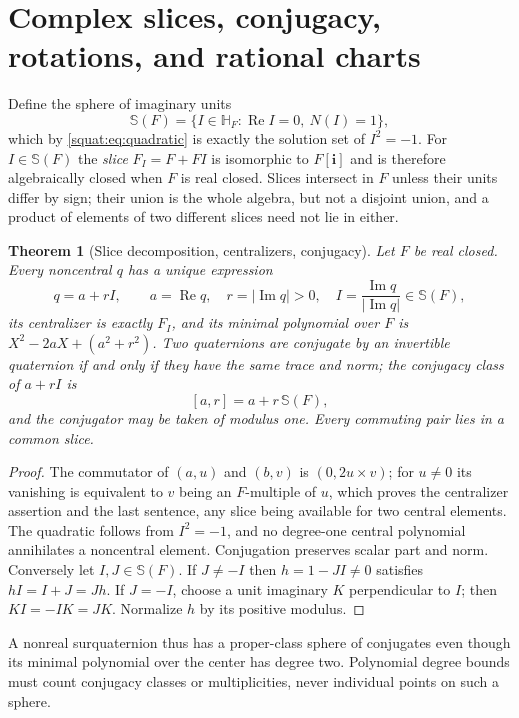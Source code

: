\documentclass[11pt,letterpaper]{article}
\numberwithin{equation}{section}
\newtheorem{theorem}{Theorem}[section]
\theoremstyle{definition}
\theoremstyle{remark}
\newcommand{\HF}{\mathbb H_F}
\newcommand{\ii}{\mathbf i}
\newcommand{\Rea}{\operatorname{Re}}
\newcommand{\Ima}{\operatorname{Im}}
\newcommand{\abs}[1]{\left|#1\right|}
\begin{document}
\section{Complex slices, conjugacy, rotations, and rational charts}\label{squat:sec:slices}

Define the sphere of imaginary units
\[
 \mathbb S(F)=\{I\in\HF:\Rea I=0,\ N(I)=1\},
\]
which by \cref{squat:eq:quadratic} is exactly the solution set of $I^2=-1$. For
$I\in\mathbb S(F)$ the \emph{slice} $F_I=F+FI$ is isomorphic to $F[\ii]$ and is therefore
algebraically closed when $F$ is real closed. Slices intersect in $F$ unless their units
differ by sign; their union is the whole algebra, but not a disjoint union, and a product
of elements of two different slices need not lie in either.

\begin{theorem}[Slice decomposition, centralizers, conjugacy]\label{squat:thm:conjugacy}
Let $F$ be real closed. Every noncentral $q$ has a unique expression
\begin{equation}\label{squat:eq:slice-decomp}
 q=a+rI,\qquad a=\Rea q,\quad r=\abs{\Ima q}>0,\quad
 I=\frac{\Ima q}{\abs{\Ima q}}\in\mathbb S(F),
\end{equation}
its centralizer is exactly $F_I$, and its minimal polynomial over $F$ is
$X^2-2aX+(a^2+r^2)$. Two quaternions are conjugate by an invertible quaternion if and
only if they have the same trace and norm; the conjugacy class of $a+rI$ is
\[
 [a,r]=a+r\,\mathbb S(F),
\]
and the conjugator may be taken of modulus one. Every commuting pair lies in a common
slice.
\end{theorem}
\begin{proof}
The commutator of $(a,u)$ and $(b,v)$ is $(0,2u\times v)$; for $u\ne0$ its vanishing is
equivalent to $v$ being an $F$-multiple of $u$, which proves the centralizer assertion and
the last sentence, any slice being available for two central elements. The quadratic
follows from $I^2=-1$, and no degree-one central polynomial annihilates a noncentral
element. Conjugation preserves scalar part and norm. Conversely let
$I,J\in\mathbb S(F)$. If $J\ne-I$ then $h=1-JI\ne0$ satisfies $hI=I+J=Jh$. If $J=-I$,
choose a unit imaginary $K$ perpendicular to $I$; then $KI=-IK=JK$. Normalize $h$ by its
positive modulus.
\end{proof}

A nonreal surquaternion thus has a proper-class sphere of conjugates even though its
minimal polynomial over the center has degree two. Polynomial degree bounds must count
conjugacy classes or multiplicities, never individual points on such a sphere.
\end{document}
